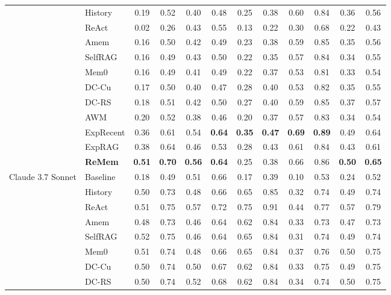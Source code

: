 \begin{table}[t!]
{\begin{tabular}{l l cc cc cc cc cc}
 & History & 0.19 & 0.52 & 0.40 & 0.48 & 0.25 & 0.38 & 0.60 & 0.84 & 0.36 & 0.56 \\
\cmidrule(lr){2-12}
 & ReAct & 0.02 & 0.26 & 0.43 & 0.55 & 0.13 & 0.22 & 0.30 & 0.68 & 0.22 & 0.43 \\
 & Amem & 0.16 & 0.50 & 0.42 & 0.49 & 0.23 & 0.38 & 0.59 & 0.85 & 0.35 & 0.56 \\
\cmidrule(lr){2-12}
 & SelfRAG & 0.16 & 0.49 & 0.43 & 0.50 & 0.22 & 0.35 & 0.57 & 0.84 & 0.34 & 0.55 \\
 & Mem0 & 0.16 & 0.49 & 0.41 & 0.49 & 0.22 & 0.37 & 0.53 & 0.81 & 0.33 & 0.54 \\
\cmidrule(lr){2-12}
 & DC-Cu & 0.17 & 0.50 & 0.40 & 0.47 & 0.28 & 0.40 & 0.53 & 0.82 & 0.35 & 0.55 \\
 & DC-RS & 0.18 & 0.51 & 0.42 & 0.50 & 0.27 & 0.40 & 0.59 & 0.85 & 0.37 & 0.57 \\
 & AWM & 0.20 & 0.52 & 0.38 & 0.46 & 0.20 & 0.37 & 0.57 & 0.83 & 0.34 & 0.54 \\
\cmidrule(lr){2-12}
 & ExpRecent & 0.36 & 0.61 & 0.54 & \textbf{0.64} & \textbf{0.35} & \textbf{0.47} & \textbf{0.69} & \textbf{0.89} & 0.49 & 0.64 \\
 & ExpRAG & 0.38 & 0.64 & 0.46 & 0.53 & 0.28 & 0.43 & 0.61 & 0.84 & 0.43 & 0.61 \\
 & \textbf{ReMem} & \textbf{0.51} & \textbf{0.70} & \textbf{0.56} & \textbf{0.64} & 0.25 & 0.38 & 0.66 & 0.86 & \textbf{0.50} & \textbf{0.65} \\
\midrule
\multirow{15}{*}{Claude 3.7 Sonnet}
  & Baseline & 0.18 & 0.49 & 0.51 & 0.66 & 0.17 & 0.39 & 0.10 & 0.53 & 0.24 & 0.52 \\
 & History & 0.50 & 0.73 & 0.48 & 0.66 & 0.65 & 0.85 & 0.32 & 0.74 & 0.49 & 0.74 \\
\cmidrule(lr){2-12}
 & ReAct & 0.51 & 0.75 & 0.57 & 0.72 & 0.75 & 0.91 & 0.44 & 0.77 & 0.57 & 0.79 \\
 & Amem & 0.48 & 0.73 & 0.46 & 0.64 & 0.62 & 0.84 & 0.33 & 0.73 & 0.47 & 0.73 \\
\cmidrule(lr){2-12}
 & SelfRAG & 0.52 & 0.75 & 0.46 & 0.64 & 0.65 & 0.84 & 0.31 & 0.74 & 0.49 & 0.74 \\
 & Mem0 & 0.51 & 0.74 & 0.48 & 0.66 & 0.65 & 0.84 & 0.37 & 0.76 & 0.50 & 0.75 \\
\cmidrule(lr){2-12}
 & DC-Cu & 0.50 & 0.74 & 0.50 & 0.67 & 0.62 & 0.84 & 0.33 & 0.75 & 0.49 & 0.75 \\
 & DC-RS & 0.50 & 0.74 & 0.52 & 0.68 & 0.62 & 0.84 & 0.34 & 0.74 & 0.50 & 0.75 \\

\end{tabular}}
\end{table}
